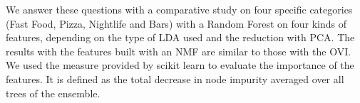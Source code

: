 \documentclass[twoside]{article}
\begin{document}
\begin{multicols}{2}
\noindent We answer these questions with a comparative study on four specific categories (Fast Food, Pizza, Nightlife and Bars) with a Random Forest on four kinds of features, depending on the type of LDA used and the reduction with PCA. The results with the features built with an NMF are similar to those with the OVI. We used the measure provided by scikit learn to evaluate the importance of the features. It is defined as the total decrease in node impurity averaged over all trees of the ensemble.

\begin{figure}[H]
\centering
{}
\quad
{}
\quad
{}
\end{figure}
\end{multicols}
\end{document}
